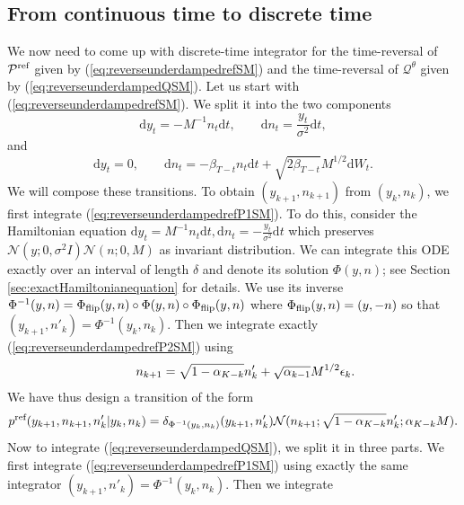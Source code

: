 \documentclass{article} %
\begin{document}
\subsection{From continuous time to discrete time}\label{subsec:integratorunderdamped}
We now need to come up with discrete-time integrator for the time-reversal of $\mathcal{P}^{\textup{ref}}$ given by (\ref{eq:reverseunderdampedrefSM}) and the time-reversal of $\mathcal{Q}^\theta$ given by (\ref{eq:reverseunderdampedQSM}).
Let us start with  (\ref{eq:reverseunderdampedrefSM}). We split it into the two components
\begin{equation}\label{eq:reverseunderdampedrefP1SM}
\mathrm{d}y_t=-M^{-1}n_t\mathrm{d}t, \qquad \mathrm{d}n_t=\frac{y_t}{\sigma^2}\mathrm{d}t,
\end{equation}
and 
\begin{equation}\label{eq:reverseunderdampedrefP2SM}
\mathrm{d}y_t=0,\qquad \mathrm{d}n_t=-\beta_{T-t} n_t\mathrm{d}t+\sqrt{2\beta_{T-t}}M^{1/2}\mathrm{d}W_t.
\end{equation}
We will compose these transitions. To obtain $(y_{k+1},n_{k+1})$ from $(y_k,n_k)$, we first integrate (\ref{eq:reverseunderdampedrefP1SM}). To do this, consider the Hamiltonian equation $\mathrm{d}y_t=M^{-1}n_t\mathrm{d}t, \mathrm{d}n_t=-\frac{y_t}{\sigma^2}\mathrm{d}t$ which preserves  $\mathcal{N}(y;0,\sigma^2I)\mathcal{N}(n;0,M)$ as invariant distribution. We can integrate this ODE exactly over an interval of length $\delta$ and denote its solution $\Phi(y,n)$; see Section \ref{sec:exactHamiltonianequation} for details. We use its inverse $\Phi^{-1}(y,n)=\Phi_{\textup{flip}}(y,n)\circ\Phi(y,n)\circ\Phi_{\textup{flip}}(y,n)$ where $\Phi_{\textup{flip}}(y,n)=(y,-n)$ so that $(y_{k+1},n'_k)=\Phi^{-1}(y_k,n_k)$. Then we integrate exactly (\ref{eq:reverseunderdampedrefP2SM}) using
\begin{equation}\label{eq:integratorOUmomentumSM}
   \qquad n_{k+1}=\sqrt{1-\alpha_{K-k}}n'_k+\sqrt{\alpha_{k-1}} M^{1/2} {{\epsilon}}_k.
\end{equation}
We have thus design a transition of the form 
\begin{equation}\label{eq:transprefunderdamped}
    p^{\textup{ref}}(y_{k+1},n_{k+1},n'_k|y_k,n_k)=\delta_{\Phi^{-1}(y_k,n_k)}(y_{k+1},n'_k)\mathcal{N}(n_{k+1};\sqrt{1-\alpha_{K-k}}n'_k; \alpha_{K-k}M).
\end{equation}
Now to integrate (\ref{eq:reverseunderdampedQSM}), we split it in three parts. We first integrate (\ref{eq:reverseunderdampedrefP1SM}) using exactly the same integrator $(y_{k+1},n'_k)=\Phi^{-1}(y_k,n_k)$. Then we integrate 
\end{document}
